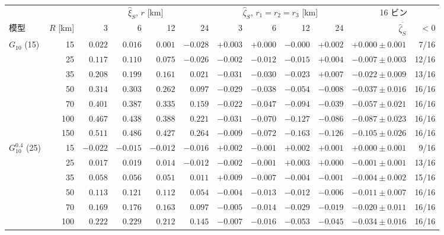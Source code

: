 \begin{tabular}{lrrrrrrrrrrr}
\toprule
& & \multicolumn{4}{c}{$\hat\xi_S$, $r$ [km]} & \multicolumn{4}{c}{$\hat\zeta_S$, $r_1 = r_2 = r_3$ [km]} & \multicolumn{2}{c}{16 ビン} \\
模型 & $R$ [km] & 3 & 6 & 12 & 24 & 3 & 6 & 12 & 24 & $\overline{\hat\zeta_S}$ & $< 0$ \\
\midrule
$G_{10}$ (15) & 15 & $0.022$ & $0.016$ & $0.001$ & $-0.028$ & $+0.003$ & $+0.000$ & $-0.000$ & $+0.002$ & $+0.000 \pm 0.001$ & 7/16 \\
 & 25 & $0.117$ & $0.110$ & $0.075$ & $-0.026$ & $-0.002$ & $-0.012$ & $-0.015$ & $+0.004$ & $-0.007 \pm 0.003$ & 12/16 \\
 & 35 & $0.208$ & $0.199$ & $0.161$ & $0.021$ & $-0.031$ & $-0.030$ & $-0.023$ & $+0.007$ & $-0.022 \pm 0.009$ & 13/16 \\
 & 50 & $0.314$ & $0.303$ & $0.262$ & $0.097$ & $-0.029$ & $-0.038$ & $-0.054$ & $-0.008$ & $-0.037 \pm 0.016$ & 16/16 \\
 & 70 & $0.401$ & $0.387$ & $0.335$ & $0.159$ & $-0.022$ & $-0.047$ & $-0.094$ & $-0.039$ & $-0.057 \pm 0.021$ & 16/16 \\
 & 100 & $0.467$ & $0.438$ & $0.388$ & $0.221$ & $-0.031$ & $-0.070$ & $-0.127$ & $-0.086$ & $-0.087 \pm 0.023$ & 16/16 \\
 & 150 & $0.511$ & $0.486$ & $0.427$ & $0.264$ & $-0.009$ & $-0.072$ & $-0.163$ & $-0.126$ & $-0.105 \pm 0.026$ & 16/16 \\
\midrule
$G_{10}^{0.4}$ (25) & 15 & $-0.022$ & $-0.015$ & $-0.012$ & $-0.016$ & $+0.002$ & $-0.001$ & $+0.002$ & $+0.001$ & $+0.000 \pm 0.001$ & 9/16 \\
 & 25 & $0.017$ & $0.019$ & $0.014$ & $-0.012$ & $-0.002$ & $-0.001$ & $+0.003$ & $+0.000$ & $-0.001 \pm 0.001$ & 13/16 \\
 & 35 & $0.058$ & $0.056$ & $0.051$ & $0.011$ & $+0.009$ & $-0.007$ & $-0.004$ & $-0.001$ & $-0.004 \pm 0.002$ & 15/16 \\
 & 50 & $0.113$ & $0.121$ & $0.112$ & $0.054$ & $-0.004$ & $-0.013$ & $-0.012$ & $-0.006$ & $-0.011 \pm 0.007$ & 16/16 \\
 & 70 & $0.169$ & $0.176$ & $0.163$ & $0.097$ & $-0.005$ & $-0.014$ & $-0.029$ & $-0.019$ & $-0.020 \pm 0.011$ & 16/16 \\
 & 100 & $0.222$ & $0.229$ & $0.212$ & $0.145$ & $-0.007$ & $-0.016$ & $-0.053$ & $-0.045$ & $-0.034 \pm 0.016$ & 16/16 \\

\end{tabular}
